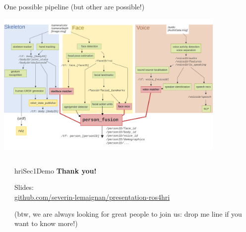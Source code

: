 \documentclass[xcolor=table,aspectratio=169]{beamer}
\begin{document}
\begin{frame}{One possible pipeline (but other are possible!)}
    \begin{center}
        \includegraphics[height=7cm]{ros4hri/ros4hri-pipeline2}
    \end{center}
\end{frame}





{
    \begin{frame}[plain]

        \begin{columns}
            \begin{column}{0.5\linewidth}
            \end{column}
            \begin{column}{0.5\linewidth}

                \vspace{14em}
                \begin{beamercolorbox}[wd=\linewidth,ht=6ex,dp=0.7ex]{hriSec1Demo}
                    \textbf{Thank you!}

                    \vspace{4em}

                    \footnotesize
                    Slides:\\
                    {\footnotesize\href{https://github.com/severin-lemaignan/presentation-ros4hri}{github.com/severin-lemaignan/presentation-ros4hri}}

                    \vspace{2em}

                    (btw, we are always looking for great people to join us: drop me line if you want to know more!)

                \end{beamercolorbox}
            \end{column}
        \end{columns}
    \end{frame}
}
\end{document}
